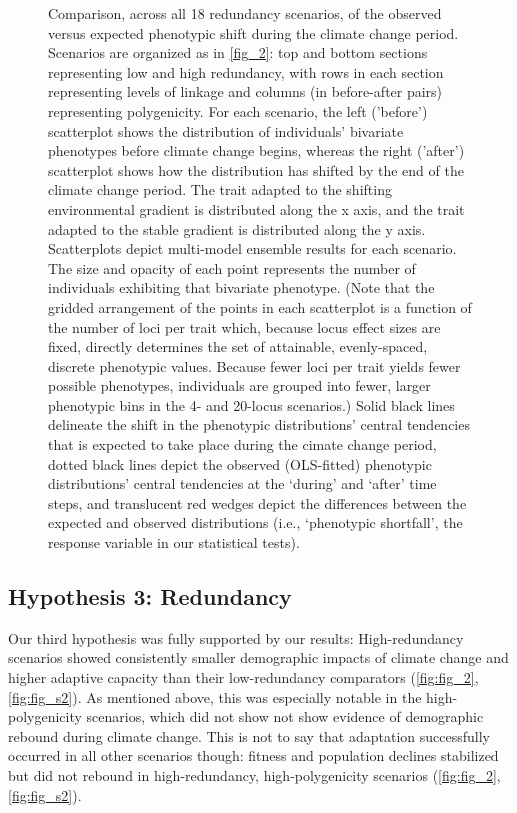 \documentclass[9pt,twocolumn,twoside,lineno]{pnas-new}
\begin{document}
\begin{figure}
\caption{Comparison, across all 18 redundancy scenarios, of the observed versus expected phenotypic shift during the climate change period. Scenarios are organized as in \ref{fig_2}: top and bottom sections representing low and high redundancy, with rows in each section representing levels of linkage and columns (in before-after pairs) representing polygenicity. For each scenario, the left ('before') scatterplot shows the distribution of individuals’ bivariate phenotypes before climate change begins, whereas the right ('after') scatterplot shows how the distribution has shifted by the end of the climate change period. The trait adapted to the shifting environmental gradient is distributed along the x axis, and the trait adapted to the stable gradient is distributed along the y axis. Scatterplots depict multi-model ensemble results for each scenario. The size and opacity of each point represents the number of individuals exhibiting that bivariate phenotype. (Note that the gridded arrangement of the points in each scatterplot is a function of the number of loci per trait which, because locus effect sizes are fixed, directly determines the set of attainable, evenly-spaced, discrete phenotypic values. Because fewer loci per trait yields fewer possible phenotypes, individuals are grouped into fewer, larger phenotypic bins in the 4- and 20-locus scenarios.) Solid black lines delineate the shift in the phenotypic distributions’ central tendencies that is expected to take place during the cimate change period, dotted black lines depict the observed (OLS-fitted) phenotypic distributions’ central tendencies at the ‘during’ and ‘after’ time steps, and translucent red wedges depict the differences between the expected and observed distributions (i.e., ‘phenotypic shortfall’, the response variable in our statistical tests).
}
\label{fig:fig_4}
\end{figure}
 

\subsection{Hypothesis 3: Redundancy}
Our third hypothesis was fully supported by our results: High-redundancy scenarios showed
consistently smaller demographic impacts of climate change and higher adaptive capacity
than their low-redundancy comparators (\ref{fig:fig_2}, \ref{fig:fig_s2}).
As mentioned above, this was especially notable in the high-polygenicity scenarios,
which did not show not show evidence of demographic rebound during climate change.
This is not to say that adaptation successfully occurred in all other scenarios though:
fitness and population declines stabilized but did not rebound
in high-redundancy, high-polygenicity scenarios (\ref{fig:fig_2}, \ref{fig:fig_s2}).
\end{document}
